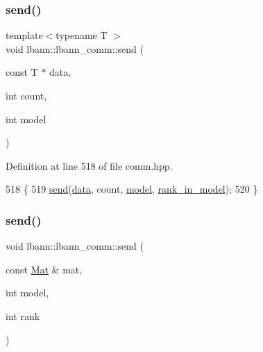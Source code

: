 \subsubsection{\texorpdfstring{send()}{send()}\hspace{0.1cm}{\footnotesize\ttfamily [2/6]}}
{\footnotesize\ttfamily template$<$typename T $>$ \\
void lbann\+::lbann\+\_\+comm\+::send (\begin{DoxyParamCaption}\item[{const T $\ast$}]{data,  }\item[{int}]{count,  }\item[{int}]{model }\end{DoxyParamCaption})\hspace{0.3cm}{\ttfamily [inline]}}



Definition at line 518 of file comm.\+hpp.


\begin{DoxyCode}
518                                                                        \{
519     \hyperlink{classlbann_1_1lbann__comm_a086078b881e7250df140ac116adb1939}{send}(\hyperlink{namespacelbann_1_1cnpy__utils_a9ac86d96ccb1f8b4b2ea16441738781f}{data}, count, \hyperlink{namespacelbann_adee41f31f15f3906cbdcce4a1417eb56a20f35e630daf44dbfa4c3f68f5399d8c}{model}, \hyperlink{classlbann_1_1lbann__comm_a0dcccd57c2b591eb7682e192e0a09033}{rank\_in\_model});
520   \}
\end{DoxyCode}
\mbox{\label{classlbann_1_1lbann__comm_ac3fa03c3ee8351daed6c7a5fd6f8535d}} 
\subsubsection{\texorpdfstring{send()}{send()}\hspace{0.1cm}{\footnotesize\ttfamily [3/6]}}
{\footnotesize\ttfamily void lbann\+::lbann\+\_\+comm\+::send (\begin{DoxyParamCaption}\item[{const \hyperlink{base_8hpp_a68f11fdc31b62516cb310831bbe54d73}{Mat} \&}]{mat,  }\item[{int}]{model,  }\item[{int}]{rank }\end{DoxyParamCaption})}



